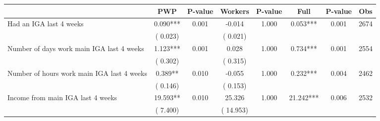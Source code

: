 
\begin{tabular}{l*{7}{c}}\hline&\multicolumn{1}{c}{PWP}&\multicolumn{1}{c}{P-value}&\multicolumn{1}{c}{Workers}&\multicolumn{1}{c}{P-value}&\multicolumn{1}{c}{Full}&\multicolumn{1}{c}{P-value}&\multicolumn{1}{c}{Obs} \\ \hline

 Had an IGA last 4 weeks       &              0.090***       &        0.001  &             -0.014       &        1.000  &              0.053***       &              0.001 &  2674 \\ 
                       &       (       0.023)             &                               &       (       0.021)                     &                               &                                               &                                &                      \\ 

 Number of days work main IGA last 4 weeks       &              1.123***       &        0.001  &              0.028       &        1.000  &              0.734***       &              0.001 &  2554 \\ 
                       &       (       0.302)             &                               &       (       0.315)                     &                               &                                               &                                &                      \\ 

 Number of hours work main IGA last 4 weeks       &              0.389**       &        0.010  &             -0.055       &        1.000  &              0.232***       &              0.004 &  2462 \\ 
                       &       (       0.146)             &                               &       (       0.153)                     &                               &                                               &                                &                      \\ 

 Income from main IGA last 4 weeks       &             19.593**       &        0.010  &             25.326       &        1.000  &             21.242***       &              0.006 &  2532 \\ 
                       &       (       7.400)             &                               &       (      14.953)                     &                               &                                               &                                &                      \\ 


\end{tabular}
